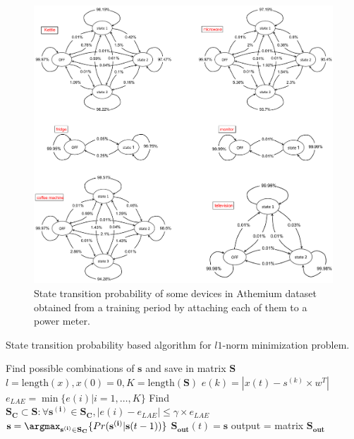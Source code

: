\begin{figure}
\centering
\includegraphics[width=1\textwidth]{./chapters/chapter3/images/Athemium_trans_proba.pdf} 
\caption{State transition probability of some devices in Athemium dataset obtained from a training period by attaching each of them to a power meter.} 
\label{fig:L1} 
\end{figure}

\begin{algorithm}
\caption{State transition probability based algorithm for $l1$-norm minimization problem.}\label{algoL3}
\begin{algorithmic}[1]
\State Find possible combinations of $\mathbf{s}$ and save in matrix $\mathbf{S}$
\State $l = \text{length}(x),x(0) = 0,K=\text{length}(\mathbf{S})$
	        \State $e(k) = |x(t)-s^{(k)}\times w^T|$
	    \EndFor
		\State $e_{LAE} = \min{\{e(i)|i=1,\ldots,K\}}$
		\State Find $\mathbf{S_C}\subset \mathbf{S}: \forall \mathbf{s^{(i)}}\in \mathbf{S_C},|e(i)-e_{LAE}|\leq \gamma \times e_{LAE}$
		\State $\mathbf{s} = \argmax_{\mathbf{s^{(i)}}\in \mathbf{S_C}}{\{Pr(\mathbf{s^{(i)}}|\mathbf{s}(t-1))\}}$
		\State $\mathbf{S_{out}}(t) = \mathbf{s}$
	\EndFor
\State output = matrix $\mathbf{S_{out}}$
\EndFunction
\end{algorithmic}
\end{algorithm}




